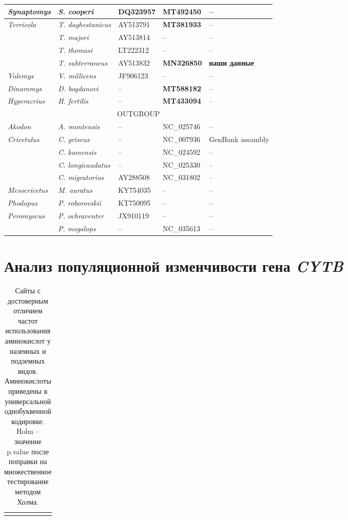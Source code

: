 \begin{landscape}
\begin{center}
\begin{longtable}{|p{3.5cm}|p{4.5cm}|p{4.0cm}|p{6.5cm}|p{4.5cm}|}
\textit{Synaptomys} & \textit{S. cooperi} & DQ323957 & \textbf{MT492450} & --\\ \hline
\multirow{4}{*}{\textit{Terricola}} & \textit{T. daghestanicus} & AY513791 & \textbf{MT381933} & --\\ \cline{2-5}
& \textit{T. majori} & AY513814 & -- & --\\ \cline{2-5}
& \textit{T. thomasi} & LT222312 & -- & --\\ \cline{2-5}
& \textit{T. subterraneus} & AY513832 & \textbf{MN326850} & \textbf{наши данные}\\ \hline
\textit{Volemys} & \textit{V. millicens} & JF906123 & -- & --\\ \hline
\textit{Dinaromys} & \textit{D. bogdanovi} & -- & \textbf{MT588182} & --\\ \hline
\textit{Hyperacrius} & \textit{H. fertilis} & -- & \textbf{MT433094} & --\\ \hline
\multicolumn{5}{|c|}{OUTGROUP} \\ \hline
\textit{Akodon} & \textit{A. montensis} & -- & NC\_025746 & --\\ \hline
\multirow{4}{*}{\textit{Cricetulus}} & \textit{C. griseus} & -- & NC\_007936 & GenBank assambly\\ \cline{2-5}
& \textit{C. kamensis} & -- & NC\_024592 & --\\ \cline{2-5}
& \textit{C. longicaudatus} & -- & NC\_025330 & --\\ \cline{2-5}
& \textit{C. migratorius} & AY288508 & NC\_031802 & --\\ \hline
\textit{Mesocricetus} & \textit{M. auratus} & KY754035 & -- & --\\ \hline
\textit{Phodopus} & \textit{P. roborovskii} & KT750095 & -- & --\\ \hline
\multirow{2}{*}{\textit{Peromyscus}} & \textit{P. ochraventer} &  JX910119 & -- & --\\ \cline{2-5}
& \textit{P. megalops} & -- & NC\_035613 & --\\ \hline


\end{longtable}

\end{center}


\chapter{Анализ популяционной изменчивости гена \textit{CYTB}}

\begin{longtable}{|l|l|p{10.5cm}|p{10.5cm}|}
	\caption{Сайты с достоверным отличием частот использования аминокислот у наземных и подземных видов. Аминокислоты приведены в универсальной однобуквенной кодировке. Holm -- значение p.value после поправки на множественное тестирование методом Холма.} \label{BigTable} \vspace{5mm} \\
	

\end{longtable}
\end{landscape}
